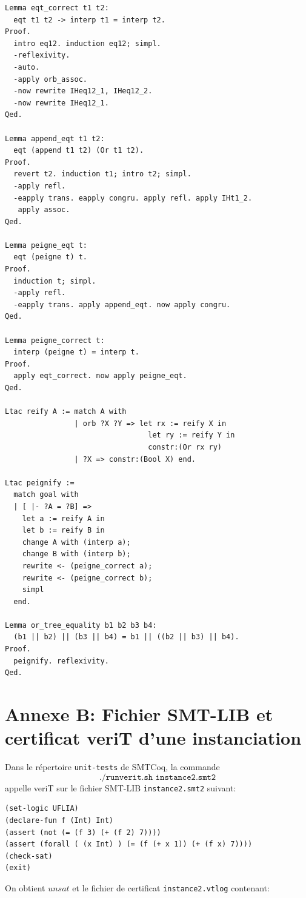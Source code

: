 \documentclass[11pt]{article}
\begin{document}
\begin{lstlisting}[frame=single]
Lemma eqt_correct t1 t2:
  eqt t1 t2 -> interp t1 = interp t2.
Proof.
  intro eq12. induction eq12; simpl.
  -reflexivity.
  -auto.
  -apply orb_assoc.
  -now rewrite IHeq12_1, IHeq12_2.
  -now rewrite IHeq12_1.
Qed.

Lemma append_eqt t1 t2:
  eqt (append t1 t2) (Or t1 t2).
Proof.
  revert t2. induction t1; intro t2; simpl.
  -apply refl.
  -eapply trans. eapply congru. apply refl. apply IHt1_2.
   apply assoc.
Qed.

Lemma peigne_eqt t:
  eqt (peigne t) t.
Proof.
  induction t; simpl.
  -apply refl.
  -eapply trans. apply append_eqt. now apply congru.
Qed.

Lemma peigne_correct t:
  interp (peigne t) = interp t.
Proof.
  apply eqt_correct. now apply peigne_eqt.
Qed.

Ltac reify A := match A with
                | orb ?X ?Y => let rx := reify X in
                                 let ry := reify Y in
                                 constr:(Or rx ry)
                | ?X => constr:(Bool X) end.

Ltac peignify :=
  match goal with
  | [ |- ?A = ?B] =>
    let a := reify A in
    let b := reify B in
    change A with (interp a);
    change B with (interp b);
    rewrite <- (peigne_correct a);
    rewrite <- (peigne_correct b);
    simpl
  end.

Lemma or_tree_equality b1 b2 b3 b4:
  (b1 || b2) || (b3 || b4) = b1 || ((b2 || b3) || b4).
Proof.
  peignify. reflexivity.
Qed.
\end{lstlisting}

\section*{Annexe B: Fichier SMT-LIB et certificat veriT d'une instanciation}

\lstset{language=Java}

Dans le répertoire \texttt{unit-tests} de SMTCoq, la commande 
\[\texttt{./runverit.sh instance2.smt2} \]
appelle veriT sur le fichier SMT-LIB \texttt{instance2.smt2} suivant:  
\begin{lstlisting}[frame=no]
(set-logic UFLIA)
(declare-fun f (Int) Int)
(assert (not (= (f 3) (+ (f 2) 7))))
(assert (forall ( (x Int) ) (= (f (+ x 1)) (+ (f x) 7))))
(check-sat)
(exit)
\end{lstlisting}

On obtient $unsat$ et le fichier de certificat \texttt{instance2.vtlog} contenant: 
\end{document}
